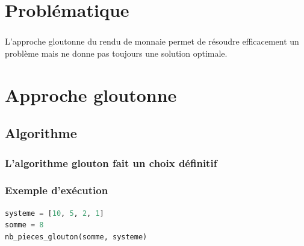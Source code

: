 \documentclass[svgnames,11pt]{beamer}
\author[]{Christophe Viroulaud}
\title{}
\date{}
\institute{Terminale NSI}
\begin{document}
\begin{frame}
\titlepage
\end{frame}
\section{Problématique}

\begin{frame}
    \frametitle{}
    L'approche gloutonne du rendu de monnaie permet de résoudre efficacement un problème mais ne donne pas toujours une solution optimale.
\begin{center}
\end{center}

\end{frame}
\section{Approche gloutonne}
\subsection{Algorithme}
\begin{frame}
    \frametitle{L'algorithme glouton fait un choix définitif}
\begin{center}
    
    \label{glouton}
\end{center}

\end{frame}
\begin{frame}[fragile]
    \frametitle{Exemple d'exécution}

    \begin{center}
        \begin{lstlisting}[language=Python]
systeme = [10, 5, 2, 1]
somme = 8
nb_pieces_glouton(somme, systeme)
        \end{lstlisting}
        \label{moncode}
    \end{center}
    \begin{center}
        \label{moncode}
    \end{center}
\end{frame}
\end{document}
